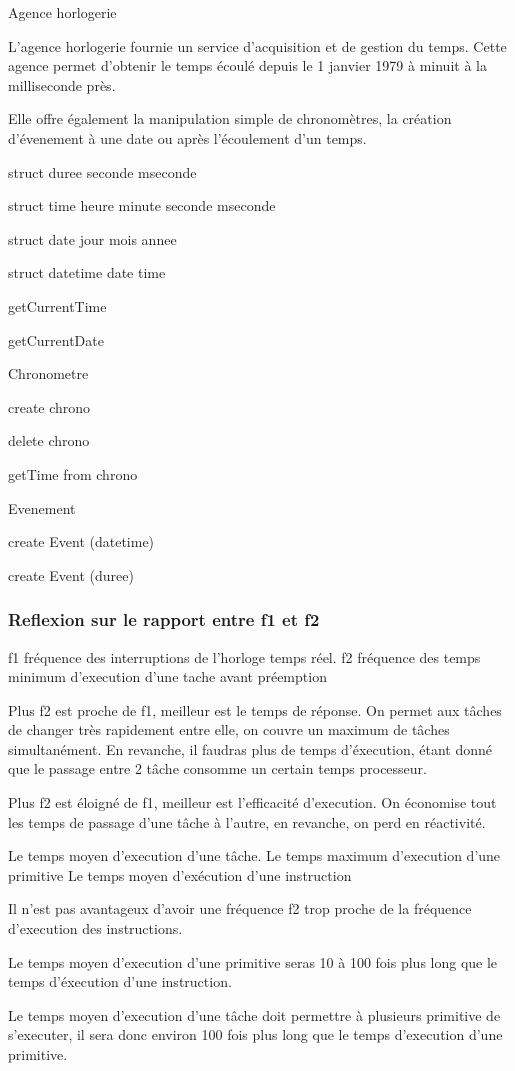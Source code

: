 Agence horlogerie

{
L'agence horlogerie fournie un service d'acquisition et de gestion du temps.
Cette agence permet d'obtenir le temps écoulé depuis le 1 janvier 1979 à minuit à la milliseconde près.

Elle offre également la manipulation simple de chronomètres, la création d'évenement à une date ou après l'écoulement d'un temps.
}
{
struct duree
seconde
mseconde

struct time
heure
minute
seconde
mseconde

struct date
jour
mois
annee

struct datetime
date
time
}
{
getCurrentTime

getCurrentDate

Chronometre

	create chrono

	delete chrono

	getTime from chrono


Evenement

	create Event (datetime)

	create Event (duree)
}
{}
{
\subsubsection{Reflexion sur le rapport entre f1 et f2}

f1 fréquence des interruptions de l'horloge temps réel.
f2 fréquence des temps minimum d'execution d'une tache avant préemption

Plus f2 est proche de f1, meilleur est le temps de réponse.
On permet aux tâches de changer très rapidement entre elle, on couvre un maximum de tâches simultanément.
En revanche, il faudras plus de temps d'éxecution, étant donné que le passage entre 2 tâche consomme un certain temps processeur.

Plus f2 est éloigné de f1, meilleur est l'efficacité d'execution.
On économise tout les temps de passage d'une tâche à l'autre, en revanche, on perd en réactivité.

Le temps moyen d'execution d'une tâche.
Le temps maximum d'execution d'une primitive
Le temps moyen d'exécution d'une instruction



Il n'est pas avantageux d'avoir une fréquence f2 trop proche de la fréquence d'execution des instructions.

Le temps moyen d'execution d'une primitive seras 10 à 100 fois plus long que le temps d'éxecution d'une instruction.

Le temps moyen d'execution d'une tâche doit permettre à plusieurs primitive de s'executer, il sera donc environ 100 fois plus long que le temps d'execution d'une primitive.
}
